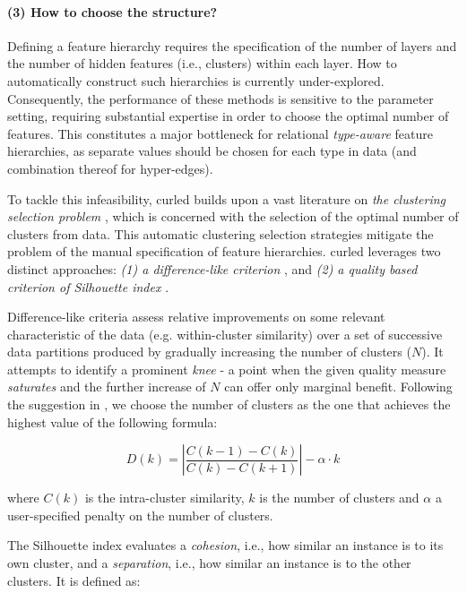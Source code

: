 \paragraph{(3) How to choose the structure?}
Defining a feature hierarchy requires the specification of the number of layers and the number of hidden features (i.e., clusters) within each layer.
How to automatically construct such hierarchies is currently under-explored.
Consequently, the performance of these methods is sensitive to the parameter setting, requiring substantial expertise in order to choose the optimal number of features.
This constitutes a major bottleneck for relational \textit{type-aware} feature hierarchies, as separate values should be chosen for each type in data (and combination thereof for hyper-edges).

To tackle this infeasibility, \gls{curled} builds upon a vast literature on \textit{the clustering selection problem} \cite{Arbelaitz:2013}, which is concerned with the selection of the optimal number of clusters from data.
This automatic clustering selection strategies mitigate the problem of the manual specification of feature hierarchies.
\gls{curled} leverages  two distinct approaches: \textit{(1) a difference-like criterion} \cite{Vendramin:2010}, and \textit{(2) a quality based criterion of Silhouette index} \cite{Rousseeuw:1987}.


Difference-like criteria assess relative improvements on some relevant characteristic of the data (e.g. within-cluster similarity) over a set of successive data partitions produced by gradually increasing the number of clusters ($N$).
It attempts to identify a prominent \textit{knee} - a point when the given quality measure \textit{saturates} and the further increase of $N$ can offer only marginal benefit.
Following the suggestion in \cite{Vendramin:2010}, we choose the number of clusters as the one that achieves the highest value of the following formula:

\begin{equation}
	D(k) = \left| \frac{C(k-1) - C(k)}{C(k) - C(k+1)} \right| - \alpha \cdot k
	\label{eq:Sat}
\end{equation}

where $C(k)$ is the intra-cluster similarity, $k$ is the number of clusters and $\alpha$ a user-specified penalty on the number of clusters.


The Silhouette index evaluates a \textit{cohesion}, i.e., how similar an instance is to its own cluster, and a \textit{separation}, i.e., how similar an instance is to the other clusters.
It is defined as:

